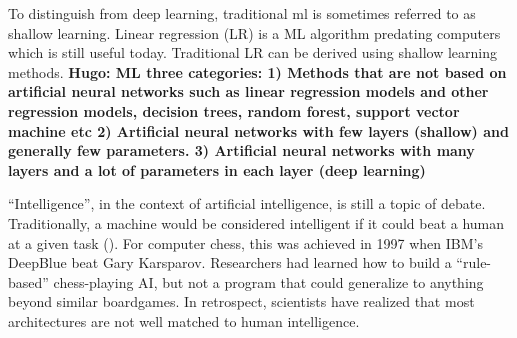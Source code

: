 To distinguish from deep learning, traditional \acrshort{ml} is sometimes referred to as shallow learning. Linear regression (LR) is a ML algorithm predating computers which is still useful today. Traditional LR can be derived using shallow learning methods. 
\textbf{Hugo: ML three categories: 1) Methods that are not based on artificial neural networks such as linear regression models and other regression models, decision trees, random forest, support vector machine etc 2) Artificial neural networks with few layers (shallow) and generally few parameters. 3) Artificial neural networks with many layers and a lot of parameters in each layer (deep learning)}

``Intelligence'', in the context of artificial intelligence, is still a topic of debate. Traditionally, a machine would be considered intelligent if it could beat a human at a given task (\cite{Chollet2019OnIntelligence}). For computer chess, this was achieved in 1997 when IBM's DeepBlue beat Gary Karsparov. Researchers had learned how to build a ``rule-based'' chess-playing AI, but not a program that could generalize to anything beyond similar boardgames. In retrospect, scientists have realized that most architectures are not well matched to human intelligence. 

